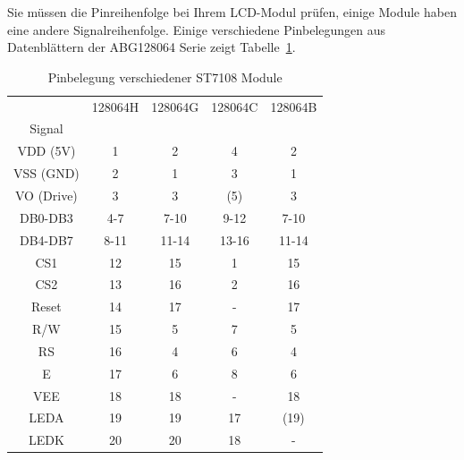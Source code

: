 Sie müssen die Pinreihenfolge bei Ihrem LCD-Modul prüfen, einige Module haben eine andere Signalreihenfolge.
Einige verschiedene Pinbelegungen aus Datenblättern der ABG128064 Serie zeigt Tabelle~\ref{tab:ST7108types}.

\begin{table}[H]
  \begin{center}
    \begin{tabular}{| c || c | c | c | c |}
    \hline
           & 128064H  &  128064G  & 128064C  & 128064B \\
    Signal &         &          &         &         \\
    \hline
    \hline
  VDD (5V) &   1     &  2       &   4     & 2       \\
    \hline
  VSS (GND) &   2     &  1       &   3     & 1       \\
    \hline
 VO (Drive) &   3     &  3       &  (5)    & 3       \\
    \hline
  DB0-DB3   &   4-7   &  7-10    &   9-12  & 7-10    \\
    \hline
  DB4-DB7   &   8-11  &  11-14   &   13-16 & 11-14   \\
    \hline
  CS1       &   12    &  15      &   1     & 15      \\
  CS2       &   13    &  16      &   2     & 16      \\
    \hline
  Reset     &   14    &  17      &   -     & 17      \\
    \hline
  R/W       &   15    &  5       &   7     & 5       \\
    \hline
  RS        &   16    &  4       &   6     & 4       \\
    \hline
  E         &   17    &  6       &   8     & 6       \\
    \hline
  VEE       &   18    &  18      &   -     & 18      \\
    \hline
  LEDA      &   19    &  19      &   17    & (19)      \\
  LEDK      &   20    &  20      &   18    & -      \\
    \hline
    \end{tabular}
  \end{center}
  \caption{Pinbelegung verschiedener ST7108 Module}
  \label{tab:ST7108types}
\end{table}

